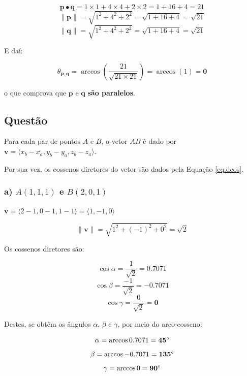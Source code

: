 \documentclass[a4paper,11pt,pagenumber=true]{article}
\newcommand{\vecp}{$\mathbf{p}$}
\newcommand{\vecq}{$\mathbf{q}$}
\newcommand{\vecnorm}[1]{\|\mathbf{#1}\|}
\newcommand{\dotprod}[2]{\mathbf{#1} \bullet \mathbf{#2}}
\theoremstyle{mytheor}
\begin{document}
            \[\dotprod{p}{q} = 1 \times 1 + 4 \times 4 + 2 \times 2 = 1 + 16 + 4 = 21\]
            \[\vecnorm{p} = \sqrt{1^2 + 4^2 + 2^2} = \sqrt{1 + 16 + 4} = \sqrt{21}\]
            \[\vecnorm{q} = \sqrt{1^2 + 4^2 + 2^2} = \sqrt{1 + 16 + 4} = \sqrt{21}\]

            E daí: 
            
            \[
                \theta_{\mathbf{p},\mathbf{q}} = 
                    \arccos \left(\frac{21}{\sqrt{21 \times 21}}\right) =
                    \arccos(1) = \mathbf{0}
            \]
            
            o que comprova que \vecp{} e \vecq{} \textbf{são paralelos}.
        
        \subsection{Questão }
        
            Para cada par de pontos $A$ e $B$, o vetor $AB$ é dado por 
            $\mathbf{v} = \langle x_b - x_a, y_b - y_a, z_b - z_a \rangle$. 
            
            Por sua vez, os cossenos diretores do vetor são dados pela Equação \ref{eq:dcos}.
            
            \subsubsection*{a) $A(1,1,1)$ e $B(2,0,1)$}
                
                $\mathbf{v} = \langle 2 - 1, 0 - 1, 1 - 1 \rangle = \langle 1, -1, 0 \rangle$
                
                \[ \vecnorm{v} = \sqrt{1^2 + (-1)^2 + 0^2} = \sqrt{2} \]
                
                Os cossenos diretores são:
                
                \[ \cos \alpha = \frac{1}{\sqrt{2}}  = \mathbf{0.7071} \]
                \[ \cos \beta  = \frac{-1}{\sqrt{2}} = \mathbf{-0.7071} \]
                \[ \cos \gamma = \frac{0}{\sqrt{2}}  = \mathbf{0} \]
        
                Destes, se obtêm os ângulos $\alpha$, $\beta$ e $\gamma$, por meio do arco-cosseno:
                
                \[\alpha = \arccos 0.7071  = \mathbf{45\degree}\]
                \[\beta  = \arccos -0.7071 = \mathbf{135\degree}\]
                \[\gamma = \arccos 0       = \mathbf{90\degree}\]
                
\end{document}
